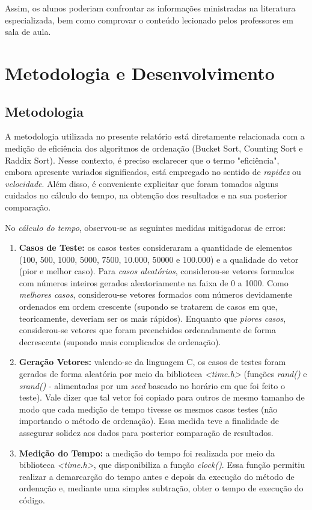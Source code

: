 \documentclass[a4paper, 12pt]{article}
\begin{document}
Assim, os alunos poderiam confrontar as informações ministradas na literatura especializada, bem como comprovar o conteúdo lecionado pelos professores em sala de aula.

\vspace{0.8cm}
\section{Metodologia e Desenvolvimento}

\subsection{Metodologia}
\tab{ }A metodologia utilizada no presente relatório está diretamente relacionada com a medição de eficiência dos algoritmos de ordenação (Bucket Sort, Counting Sort e Raddix Sort). Nesse contexto, é preciso esclarecer que o termo "eficiência", embora apresente variados significados, está empregado no sentido de \textit{rapidez} ou \textit{velocidade}. Além disso, é conveniente explicitar que foram tomados alguns cuidados no cálculo do tempo, na obtenção dos resultados e na sua posterior comparação. 

No \textit{cálculo do tempo}, observou-se as seguintes medidas mitigadoras de erros:
\begin{enumerate}
    \item \textbf{Casos de Teste:} os casos testes consideraram a quantidade de elementos (100, 500, 1000, 5000, 7500, 10.000, 50000 e 100.000) e a qualidade do vetor (pior e melhor caso). Para \textit{casos aleatórios}, considerou-se vetores formados com números inteiros gerados aleatoriamente na faixa de 0 a 1000. Como \textit{melhores casos}, considerou-se vetores formados com números devidamente ordenados em ordem crescente (supondo se tratarem de casos em que, teoricamente, deveriam ser os mais rápidos). Enquanto que \textit{piores casos}, considerou-se vetores que foram preenchidos ordenadamente de forma decrescente (supondo mais complicados de ordenação).
    \item \textbf{Geração Vetores:} valendo-se da linguagem C, os casos de testes foram gerados de forma aleatória por meio da biblioteca \textit{<time.h>} (funções \textit{rand()} e \textit{srand()} - alimentadas por um \textit{seed} baseado no horário em que foi feito o teste). Vale dizer que tal vetor foi copiado para outros de mesmo tamanho de modo que cada medição de tempo tivesse os mesmos casos testes (não importando o método de ordenação). Essa medida teve a finalidade de assegurar solidez aos dados para posterior comparação de resultados.
    \item \textbf{Medição do Tempo:} a medição do tempo foi realizada por meio da biblioteca \textit{<time.h>}, que disponibiliza a função \textit{clock()}. Essa função permitiu realizar a demarcarção do tempo antes e depois da execução do método de ordenação e, mediante uma simples subtração, obter o tempo de execução do código.
\end{enumerate}
\end{document}
